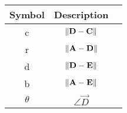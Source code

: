\begin{tabular}{|c|c|c|}
\hline
Symbol & Description\\
\hline
c & $\left\lVert\mathbf{D} -\mathbf{C}\right\rVert$ \\
\hline
r & $\left\lVert\mathbf{A} -\mathbf{D}\right\rVert$ \\
\hline
d & $\left\lVert\mathbf{D} - \mathbf{E}\right\rVert$\\
\hline
b & $\left\lVert\mathbf{A} - \mathbf{E}\right\rVert$\\
\hline
$\theta$ & $\angle{\vec{D}}$ \\
\hline
\end{tabular}
